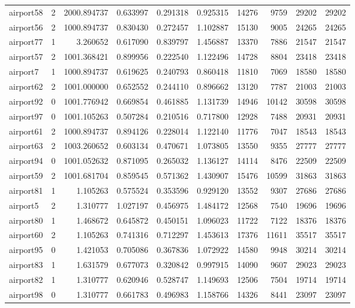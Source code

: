 \begin{longtable}{|l|r|r|r|r|r|r|r|r|r|}
airport58 & 2 & 2000.894737 & 0.633997 & 0.291318 & 0.925315 & 14276 & 9759 & 29202 & 29202 \\
airport56 & 2 & 1000.894737 & 0.830430 & 0.272457 & 1.102887 & 15130 & 9005 & 24265 & 24265 \\
airport77 & 1 & 3.260652 & 0.617090 & 0.839797 & 1.456887 & 13370 & 7886 & 21547 & 21547 \\
airport57 & 2 & 1001.368421 & 0.899956 & 0.222540 & 1.122496 & 14728 & 8804 & 23418 & 23418 \\
airport7 & 1 & 1000.894737 & 0.619625 & 0.240793 & 0.860418 & 11810 & 7069 & 18580 & 18580 \\
airport62 & 2 & 1001.000000 & 0.652552 & 0.244110 & 0.896662 & 13120 & 7787 & 21003 & 21003 \\
airport92 & 0 & 1001.776942 & 0.669854 & 0.461885 & 1.131739 & 14946 & 10142 & 30598 & 30598 \\
airport97 & 0 & 1001.105263 & 0.507284 & 0.210516 & 0.717800 & 12928 & 7488 & 20931 & 20931 \\
airport61 & 2 & 1000.894737 & 0.894126 & 0.228014 & 1.122140 & 11776 & 7047 & 18543 & 18543 \\
airport63 & 2 & 1003.260652 & 0.603134 & 0.470671 & 1.073805 & 13550 & 9355 & 27777 & 27777 \\
airport94 & 0 & 1001.052632 & 0.871095 & 0.265032 & 1.136127 & 14114 & 8476 & 22509 & 22509 \\
airport59 & 2 & 1001.681704 & 0.859545 & 0.571362 & 1.430907 & 15476 & 10599 & 31863 & 31863 \\
airport81 & 1 & 1.105263 & 0.575524 & 0.353596 & 0.929120 & 13552 & 9307 & 27686 & 27686 \\
airport5 & 2 & 1.310777 & 1.027197 & 0.456975 & 1.484172 & 12568 & 7540 & 19696 & 19696 \\
airport80 & 1 & 1.468672 & 0.645872 & 0.450151 & 1.096023 & 11722 & 7122 & 18376 & 18376 \\
airport60 & 2 & 1.105263 & 0.741316 & 0.712297 & 1.453613 & 17376 & 11611 & 35517 & 35517 \\
airport95 & 0 & 1.421053 & 0.705086 & 0.367836 & 1.072922 & 14580 & 9948 & 30214 & 30214 \\
airport83 & 1 & 1.631579 & 0.677073 & 0.320842 & 0.997915 & 14090 & 9607 & 29023 & 29023 \\
airport82 & 1 & 1.310777 & 0.620946 & 0.528747 & 1.149693 & 12506 & 7504 & 19714 & 19714 \\
airport98 & 0 & 1.310777 & 0.661783 & 0.496983 & 1.158766 & 14326 & 8441 & 23097 & 23097 \\

\end{longtable}
